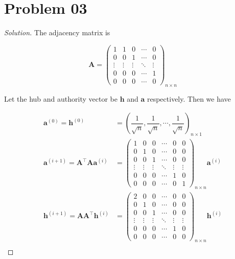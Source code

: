 \documentclass{article}
\newenvironment{solution}{\begin{proof}[\noindent\it Solution]}{\end{proof}}
\newcommand{\bd}[1]{\boldsymbol{#1}}
\begin{document}
\section{Problem 03}
\vspace{1em}
\begin{solution}
    The adjacency matrix is 

    \vspace{-1.5em}
    $$\bd{A} =  \left(
        \begin{array}{ccccc}
            1 & 1 & 0 & \cdots & 0\\
            0 & 0 & 1 & \cdots & 0 \\
            \vdots & \vdots & \vdots & \ddots & \vdots \\
            0 & 0 & 0 & \cdots & 1 \\
            0 & 0 & 0 & \cdots & 0
        \end{array}
    \right)_{n\times n}$$

    \hspace{2.6em}
    Let the hub and authority vector be $\bd{h}$ and $\bd{a}$ respectively. Then we have

    \vspace{-1.5em}
    \begin{align*}
        \bd{a}^{(0)}=\bd{h}^{(0)} &= \left(\dfrac{1}{\sqrt{n}},\dfrac{1}{\sqrt{n}},\cdots,\dfrac{1}{\sqrt{n}}\right)_{n\times 1} \\
        \bd{a}^{(i+1)} = \bd{A}^\top \bd{A} \bd{a}^{(i)} &= \left(
            \begin{array}{cccccc}
                1 & 0 & 0 & \cdots & 0 & 0\\
                0 & 1 & 0 & \cdots & 0 & 0\\
                0 & 0 & 1 & \cdots & 0 & 0\\
                \vdots & \vdots & \vdots & \ddots & \vdots & \vdots\\
                0 & 0 & 0 & \cdots & 1 & 0\\
                0 & 0 & 0 & \cdots & 0 & 1
            \end{array}
        \right)_{n\times n} \bd{a}^{(i)} \\
        \bd{h}^{(i+1)} = \bd{A}\bd{A}^\top \bd{h}^{(i)} &= \left(
            \begin{array}{cccccc}
                2 & 0 & 0 & \cdots & 0 & 0\\
                0 & 1 & 0 & \cdots & 0 & 0\\
                0 & 0 & 1 & \cdots & 0 & 0\\
                \vdots & \vdots & \vdots & \ddots & \vdots & \vdots\\
                0 & 0 & 0 & \cdots & 1 & 0\\
                0 & 0 & 0 & \cdots & 0 & 0
            \end{array}
        \right)_{n\times n} \bd{h}^{(i)} \\
    \end{align*}


\end{solution}
\end{document}
